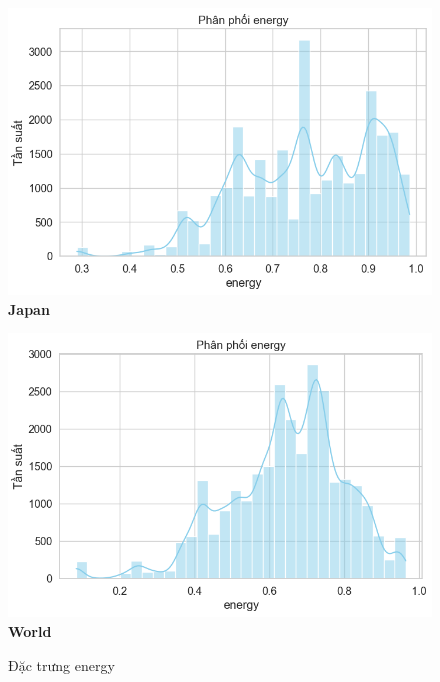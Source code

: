 \begin{itemize}
\begin{itemize}
\begin{figure}[H]
        \begin{minipage}{0.45\textwidth}
            \centering
            \includegraphics[width=\linewidth]{../graphics/data_top50/figure/3/EDA_japan.png}
            \\[4pt] {\small \textbf{Japan}}
        \end{minipage}
        \hfill
        \begin{minipage}{0.45\textwidth}
            \centering
            \includegraphics[width=\linewidth]{../graphics/data_top50/figure/3/EDA_world.png}
            \\[4pt] {\small \textbf{World}}
        \end{minipage}



        
        \caption{Đặc trưng energy}
        \label{fig:energy-regions}
    \end{figure}
    

\end{itemize}
\end{itemize}
